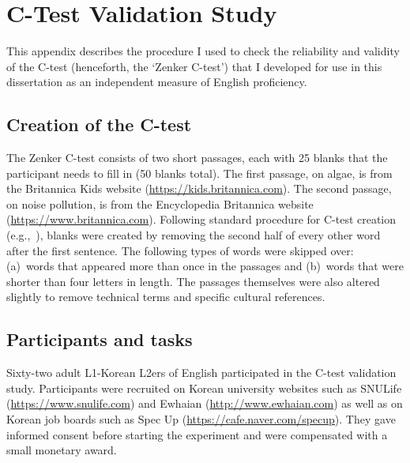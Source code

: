 
\chapter{C-Test Validation Study}\label{app-validation}

\setlength{\parindent}{2.6em}

This appendix describes the procedure I used to check the reliability and validity of the C-test (henceforth, the `Zenker C-test') that I developed for use in this dissertation as an independent measure of English proficiency.

\section{Creation of the C-test}\label{app-validation-creation}

The Zenker C-test consists of two short passages, each with 25 blanks that the participant needs to fill in (50 blanks total). The first passage, on algae, is from the Britannica Kids website (\url{https://kids.britannica.com}). The second passage, on noise pollution, is from the Encyclopedia Britannica website (\url{https://www.britannica.com}). Following standard procedure for C-test creation (e.g.,~\cite{babaii.ansary2001}), blanks were created by removing the second half of every other word after the first sentence. The following types of words were skipped over: (a)~words that appeared more than once in the passages and (b)~words that were shorter than four letters in length. The passages themselves were also altered slightly to remove technical terms and specific cultural references.

\section{Participants and tasks}\label{app-validation-participant}

Sixty-two adult L1-Korean L2ers of English participated in the C-test validation study. Participants were recruited on Korean university websites such as SNULife (\url{https://www.snulife.com}) and Ewhaian (\url{http://www.ewhaian.com}) as well as on Korean job boards such as Spec Up (\url{https://cafe.naver.com/specup}). They gave informed consent before starting the experiment and were compensated with a small monetary award.

